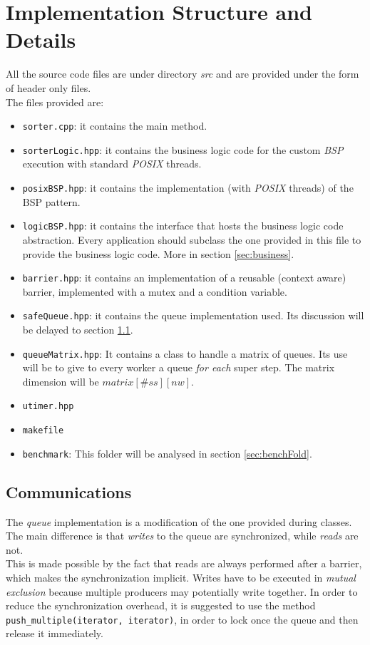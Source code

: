 \documentclass[]{article}
\def\code#1{\texttt{#1}}
\begin{document}
\section{Implementation Structure and Details}
\label{sec:implDetails}

All the source code files are under directory \emph{src} and are provided under the form of header only files. \\The files provided are:
\begin{itemize}
	\item \code{sorter.cpp}: it contains the main method. 
	\item \code{sorterLogic.hpp}: it contains the business logic code for the custom \emph{BSP} execution with standard \emph{POSIX} threads.
	\item \code{posixBSP.hpp}: it contains the implementation (with \emph{POSIX} threads) of the BSP pattern.
	\item \code{logicBSP.hpp}: it contains the interface that hosts the business logic code abstraction. Every application should subclass the one provided in this file to provide the business logic code. More in section \ref{sec:business}.
	\item \code{barrier.hpp}: it contains an implementation of a reusable (context aware) barrier, implemented with a mutex and a condition variable.
	\item \code{safeQueue.hpp}: it contains the queue implementation used. Its discussion will be delayed to section \ref{sec:queue}.
	\item \code{queueMatrix.hpp}: It contains a class to handle a matrix of queues. Its use will be to give to every worker a queue \emph{for each} super step. The matrix dimension will be $matrix[\#\mathit{ss}][\mathit{nw}]$.
	\item \code{utimer.hpp}
	\item \code{makefile}
	\item \code{benchmark}: This folder will be analysed in section \ref{sec:benchFold}.
\end{itemize}

\subsection{Communications}
\label{sec:queue}
The \emph{queue} implementation is a modification of the one provided during classes. The main difference is that \emph{writes} to the queue are synchronized, while \emph{reads} are not. \\ This is made possible by the fact that reads are always performed after a barrier, which makes the synchronization implicit. Writes have to be executed in \emph{mutual exclusion} because multiple producers may potentially write together. In order to reduce the synchronization overhead, it is suggested to use the method \code{push\_multiple(iterator, iterator)}, in order to lock once the queue and then release it immediately.
\end{document}
